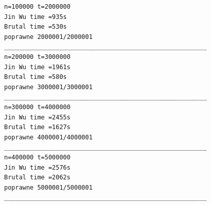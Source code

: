 \documentclass{article}
\begin{document}
\begin{verbatim}
n=100000 t=2000000
Jin Wu time =935s
Brutal time =530s
poprawne 2000001/2000001
_______________________________________________________
n=200000 t=3000000
Jin Wu time =1961s
Brutal time =580s
poprawne 3000001/3000001
_______________________________________________________
n=300000 t=4000000
Jin Wu time =2455s
Brutal time =1627s
poprawne 4000001/4000001
_______________________________________________________
n=400000 t=5000000
Jin Wu time =2576s
Brutal time =2062s
poprawne 5000001/5000001
_______________________________________________________
\end{verbatim}
    


\end{document}
